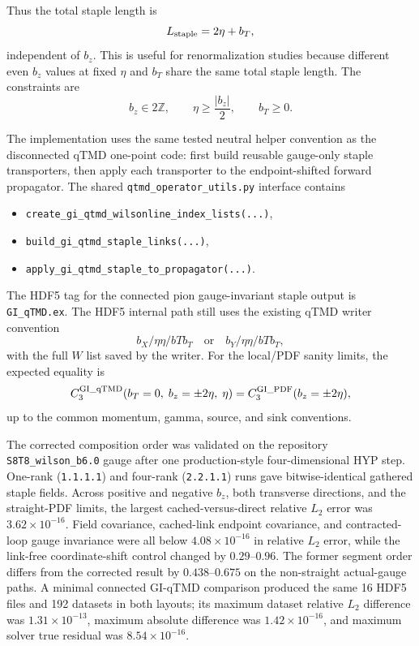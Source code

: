 \documentclass[11pt,a4paper]{article}
\begin{document}
Thus the total staple length is
\begin{equation}
  L_{\rm staple} = 2\eta + b_T,
\end{equation}
independent of $b_z$.  This is useful for renormalization studies because
different even $b_z$ values at fixed $\eta$ and $b_T$ share the same total
staple length.  The constraints are
\begin{equation}
  b_z \in 2\mathbb{Z}, \qquad \eta \geq \frac{|b_z|}{2}, \qquad b_T \geq 0.
\end{equation}

The implementation uses the same tested neutral helper convention as the
disconnected qTMD one-point code: first build reusable gauge-only staple
transporters, then apply each transporter to the endpoint-shifted forward
propagator.  The shared \texttt{qtmd\_operator\_utils.py} interface contains
\begin{itemize}[nosep]
  \item \texttt{create\_gi\_qtmd\_wilsonline\_index\_lists(...)},
  \item \texttt{build\_gi\_qtmd\_staple\_links(...)},
  \item \texttt{apply\_gi\_qtmd\_staple\_to\_propagator(...)}.
\end{itemize}

The HDF5 tag for the connected pion gauge-invariant staple output is
\texttt{GI\_qTMD.ex}.  The HDF5 internal path still uses the existing qTMD
writer convention
\begin{equation}
  b_X/\eta\eta/bT b_T
  \quad \text{or} \quad
  b_Y/\eta\eta/bT b_T,
\end{equation}
with the full $W$ list saved by the writer.  For the local/PDF sanity limits,
the expected equality is
\begin{equation}
  C_3^{\rm GI\_qTMD}(b_T=0,\; b_z=\pm 2\eta,\; \eta)
  =
  C_3^{\rm GI\_PDF}(b_z=\pm 2\eta),
\end{equation}
up to the common momentum, gamma, source, and sink conventions.

The corrected composition order was validated on the repository
\texttt{S8T8\_wilson\_b6.0} gauge after one production-style four-dimensional
HYP step.  One-rank (\texttt{1.1.1.1}) and four-rank (\texttt{2.2.1.1}) runs
gave bitwise-identical gathered staple fields.  Across positive and negative
$b_z$, both transverse directions, and the straight-PDF limits, the largest
cached-versus-direct relative $L_2$ error was $3.62\times10^{-16}$.  Field
covariance, cached-link endpoint covariance, and contracted-loop gauge
invariance were all below $4.08\times10^{-16}$ in relative $L_2$ error, while
the link-free coordinate-shift control changed by $0.29$--$0.96$.  The former
segment order differs from the corrected result by $0.438$--$0.675$ on the
non-straight actual-gauge paths.  A minimal connected GI-qTMD comparison
produced the same 16 HDF5 files and 192 datasets in both layouts; its maximum
dataset relative $L_2$ difference was $1.31\times10^{-13}$, maximum absolute
difference was $1.42\times10^{-16}$, and maximum solver true residual was
$8.54\times10^{-16}$.
\end{document}
